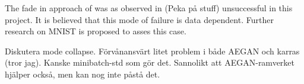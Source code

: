 The fade in approach of \textcite{karras2017progressive} was as observed in (Peka på stuff) unsuccessful in this project. It is believed that this mode of failure is data dependent. Further research on MNIST is proposed to asses this case.

Diskutera mode collapse. Förvånansvärt litet problem i både AEGAN och karras (tror jag). Kanske minibatch-std som gör det. Sannolikt att AEGAN-ramverket hjälper också, men kan nog inte påstå det.

